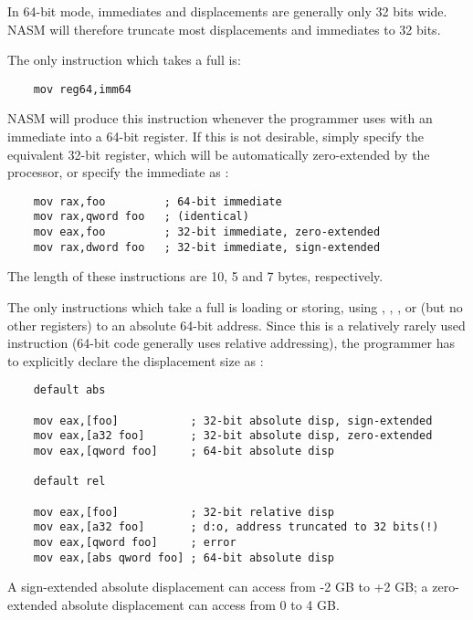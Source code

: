 
In 64-bit mode, immediates and displacements are generally only 32
bits wide. NASM will therefore truncate most displacements and
immediates to 32 bits.

The only instruction which takes a full  is:

\begin{lstlisting}
    mov reg64,imm64
\end{lstlisting}

NASM will produce this instruction whenever the programmer uses
 with an immediate into a 64-bit register. If this is not
desirable, simply specify the equivalent 32-bit register, which will
be automatically zero-extended by the processor, or specify the
immediate as :

\begin{lstlisting}
    mov rax,foo         ; 64-bit immediate
    mov rax,qword foo   ; (identical)
    mov eax,foo         ; 32-bit immediate, zero-extended
    mov rax,dword foo   ; 32-bit immediate, sign-extended
\end{lstlisting}

The length of these instructions are 10, 5 and 7 bytes, respectively.

The only instructions which take a full 
is loading or storing, using , , , 
or  (but no other registers) to an absolute 64-bit address.
Since this is a relatively rarely used instruction (64-bit code
generally uses relative addressing), the programmer has to explicitly
declare the displacement size as :

\begin{lstlisting}
    default abs

    mov eax,[foo]           ; 32-bit absolute disp, sign-extended
    mov eax,[a32 foo]       ; 32-bit absolute disp, zero-extended
    mov eax,[qword foo]     ; 64-bit absolute disp

    default rel

    mov eax,[foo]           ; 32-bit relative disp
    mov eax,[a32 foo]       ; d:o, address truncated to 32 bits(!)
    mov eax,[qword foo]     ; error
    mov eax,[abs qword foo] ; 64-bit absolute disp
\end{lstlisting}

A sign-extended absolute displacement can access from -2 GB to +2 GB;
a zero-extended absolute displacement can access from 0 to 4 GB.

